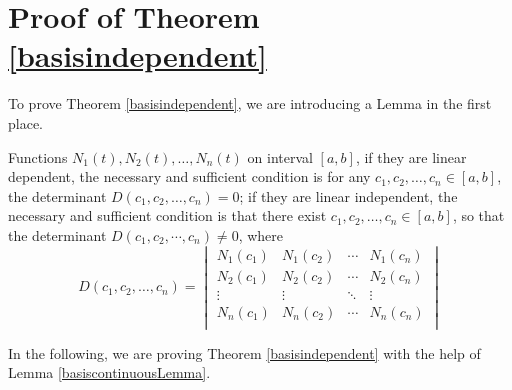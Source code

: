 \section{Proof of Theorem \ref{basisindependent}}\label{AppendixBasisproof}

To prove Theorem \ref{basisindependent}, we are introducing a Lemma \cite{Peng1983linear} in the first place. 

\begin{lemma}\label{basiscontinuousLemma}
Functions $N_1(t),N_2(t),\ldots,N_n(t)$ on interval $[a,b]$, if they are linear dependent, the necessary and sufficient condition is for any $c_1,c_2,\ldots,c_n \in [a,b]$, the determinant $D(c_1,c_2,\ldots,c_n)=0$; if they are linear independent, the necessary and sufficient condition is that there exist $c_1,c_2,\ldots,c_n \in [a,b]$, so that the determinant $D(c_1,c_2,\cdots,c_n) \neq 0$, where 
\begin{equation*}
D(c_1,c_2,\ldots,c_n)=
\begin{vmatrix}
N_1(c_1) & N_1(c_2) & \cdots& N_1(c_n)\\
N_2(c_1) & N_2(c_2)& \cdots & N_2(c_n)\\
 \vdots  &  \vdots  & \ddots  & \vdots  \\  
N_n(c_1) & N_n(c_2) & \cdots & N_n(c_n)\\
\end{vmatrix}
\end{equation*}
\end{lemma}

In the following, we are proving Theorem \ref{basisindependent} with the help of Lemma \ref{basiscontinuousLemma}. 

